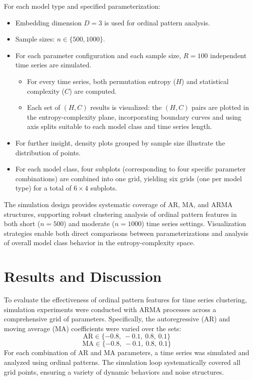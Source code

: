 \documentclass[12pt,a4paper]{article}
\begin{document}
For each model type and specified parameterization:
\begin{itemize}
	\item Embedding dimension $D=3$ is used for ordinal pattern analysis.
	\item Sample sizes: $n \in \{500, 1000\}$.
	\item For each parameter configuration and each sample size, $R=100$ independent time series are simulated.
	\begin{itemize}
	\item For every time series, both permutation entropy ($H$) and statistical complexity ($C$) are computed.
	\item Each set of $(H, C)$ results is visualized: the $(H, C)$  pairs are plotted in the entropy-complexity plane, incorporating boundary curves and using axis splits suitable to each model class and time series length.
	\end{itemize}
	\item For further insight, density plots grouped by sample size illustrate the distribution of points.
	\item For each model class, four subplots (corresponding to four specific parameter combinations) are combined into one grid, yielding six grids (one per model type) for a total of $6 \times 4$ subplots.
\end{itemize}

The simulation design provides systematic coverage of AR, MA, and ARMA structures, supporting robust clustering analysis of ordinal pattern features in both short ($n=500$) and moderate ($n=1000$) time series settings. Visualization strategies enable both direct comparisons between parameterizations and analysis of overall model class behavior in the entropy-complexity space.

\section{Results and Discussion}

To evaluate the effectiveness of ordinal pattern features for time series clustering, simulation experiments were conducted with ARMA processes across a comprehensive grid of parameters. Specifically, the autoregressive (AR) and moving average (MA) coefficients were varied over the sets:
\[
\text{AR} \in \{-0.8,\ -0.1,\ 0.8,\ 0.1 \}
\]
\[
\text{MA} \in \{-0.8,\ -0.1,\ 0.8,\ 0.1 \}
\]
For each combination of AR and MA parameters, a time series was simulated and analyzed using ordinal patterns. The simulation loop systematically covered all grid points, ensuring a variety of dynamic behaviors and noise structures.
\end{document}
